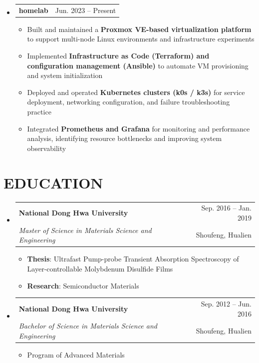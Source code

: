 \documentclass[letterpaper,11pt]{article}
\makeatletter
\newcommand{\resumeItem}[1]{
  \item\small{
    {#1 \vspace{-1pt}}
  }
}
\newcommand{\resumeSubheading}[4]{
  \vspace{-1pt}\item
    \begin{tabular*}{\textwidth}[t]{l@{\extracolsep{\fill}}r}
      \textbf{#1} & {\color{dark-grey}\small #2}\vspace{1pt}\\ %
      \textit{#3} & {\color{dark-grey} \small #4}\\ %
    \end{tabular*}\vspace{-4pt}
}
\newcommand{\resumeProjectHeading}[2]{
    \item
    \begin{tabular*}{\textwidth}{l@{\extracolsep{\fill}}r}
      #1 & {\color{dark-grey} #2} \\  %
    \end{tabular*}\vspace{-4pt}
}
\newcommand{\resumeSubHeadingListStart}{\begin{itemize}[leftmargin=0in, label={}]}
\newcommand{\resumeSubHeadingListEnd}{\end{itemize}}
\newcommand{\resumeItemListStart}{\begin{itemize}}
\newcommand{\resumeItemListEnd}{\end{itemize}\vspace{0pt}}
\makeatother
\begin{document}
\resumeSubHeadingListStart
\resumeProjectHeading
    {\textbf{homelab}} {Jun. 2023 -- Present}
    \resumeItemListStart
      \resumeItem{Built and maintained a \textbf{Proxmox VE-based virtualization platform} to support multi-node Linux environments and infrastructure experiments}
      \resumeItem{Implemented \textbf{Infrastructure as Code (Terraform) and configuration management (Ansible)} to automate VM provisioning and system initialization}
      \resumeItem{Deployed and operated \textbf{Kubernetes clusters (k0s / k3s)} for service deployment, networking configuration, and failure troubleshooting practice}
      \resumeItem{Integrated \textbf{Prometheus and Grafana} for monitoring and performance analysis, identifying resource bottlenecks and improving system observability}
    \resumeItemListEnd
\resumeSubHeadingListEnd

\section {EDUCATION}
\resumeSubHeadingListStart
\resumeSubheading
  {National Dong Hwa University}{Sep. 2016 -- Jan. 2019}
  {Master of Science in Materials Science and Engineering}{Shoufeng, Hualien}
    \resumeItemListStart
  \resumeItem {\textbf{Thesis}: Ultrafast Pump-probe Transient Absorption Spectroscopy of Layer-controllable Molybdenum Disulfide Films}
    \resumeItem 
        {\textbf{Research}: Semiconductor Materials }
    \resumeItemListEnd
\resumeSubHeadingListEnd

\resumeSubHeadingListStart
\resumeSubheading
  {National Dong Hwa University}{Sep. 2012 -- Jun. 2016}
  {Bachelor of Science in Materials Science and Engineering}{Shoufeng, Hualien}
    \resumeItemListStart
    \resumeItem {Program of Advanced Materials}
    \resumeItemListEnd
\resumeSubHeadingListEnd

%
\end{document}
